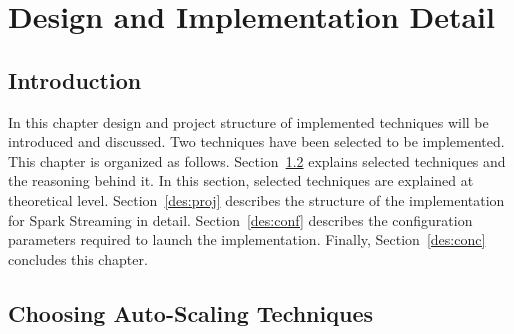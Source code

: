 \chapter{Design and Implementation Detail}
\label{design}

\section{Introduction}
\label{des:intro}

In this chapter design and project structure of implemented techniques will be introduced and discussed. Two techniques have been selected to be implemented. This chapter is organized as follows. Section~\ref{des:choose} explains selected techniques and the reasoning behind it. In this section, selected techniques are explained at theoretical level. Section~\ref{des:proj} describes the structure of the implementation for Spark Streaming in detail. Section~\ref{des:conf} describes the configuration parameters required to launch the implementation. Finally, Section~\ref{des:conc} concludes this chapter.

\section{Choosing Auto-Scaling Techniques}
\label{des:choose}

